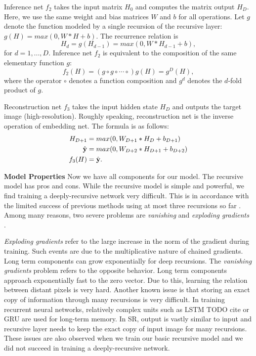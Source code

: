 \documentclass[10pt,twocolumn,letterpaper]{article}
\begin{document}
Inference net $f_2$ takes the input matrix $H_0$ and computes the matrix output $H_{D}$. Here, we use the same weight and bias matrices $W$ and $b$ for all operations.  Let $g$ denote the function modeled by a single recursion of the recursive layer: $g(H)=max(0,W*H+b)$. The recurrence relation is  
\begin{equation}
 H_d = g(H_{d-1}) = max(0,W*H_{d-1}+b),
\end{equation}
for $d = 1, ..., D$. 
Inference net $f_2$ is equivalent to the composition of the same elementary function $g$: 
\begin{equation}
f_2(H) = (g \circ g \circ \cdots \circ) g(H) =  g^{D}(H),
\end{equation}
where the operator $\circ$ denotes a function composition and $g^{d}$ denotes the $d$-fold product of $g$.

Reconstruction net $f_3$ takes the input hidden state $H_D$ and outputs the target image (high-resolution). Roughly speaking, reconstruction net is the inverse operation of embedding net. The formula is as follows:
\begin{align}
	H_{D+1} &= max(0, W_{D+1}*H_D + b_{D+1})\\
	\hat{{\bf y}} &= max(0, W_{D+2}*H_{D+1} + b_{D+2})\\
	f_3(H) &= \hat{{\bf y}}.
\end{align}

\textbf{Model Properties} Now we have all components for our model. The recursive model has pros and cons. While the recursive model is simple and powerful, we find training a deeply-recursive network very difficult. This is in accordance with the limited success of previous methods using at most three recursions so far \cite{Liang_2015_CVPR}.  Among many reasons, two severe problems are \textit{vanishing} and \textit{exploding gradients} \cite{bengio1994learning, pascanu2013difficulty}.  

\textit{Exploding gradients} refer to the large increase in the norm
of the gradient during training. Such events are due to
the multiplicative nature of chained gradients. Long term components can grow exponentially for deep recursions. The
\textit{vanishing gradients} problem refers to the opposite behavior. Long term components approach exponentially
fast to the zero vector. Due to this, learning the relation between distant pixels is very hard. Another known issue is that storing an exact copy of information through many recursions is very difficult. In training recurrent neural networks, relatively complex units such as LSTM TODO cite or GRU are used for long-term memory. In SR, output is vastly similar to input and recursive layer needs to keep the exact copy of input image for many recursions. These issues are also observed when we train our basic recursive model and we did not succeed in training a deeply-recursive network. 
\end{document}
